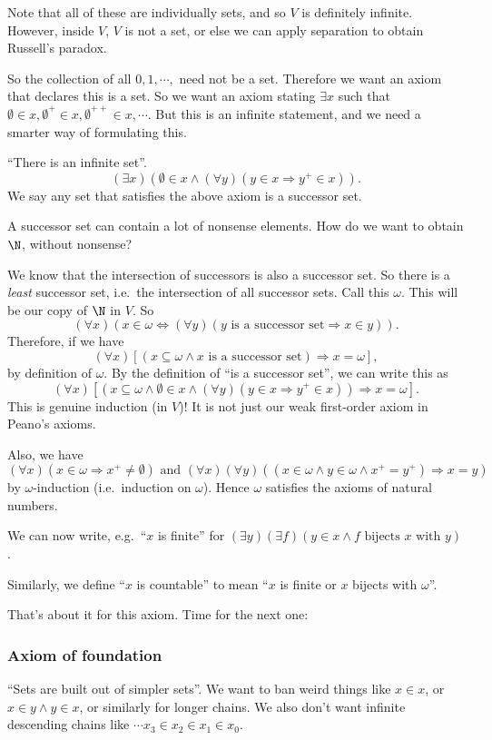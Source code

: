 \documentclass[a4paper]{article}
\begin{document}
Note that all of these are individually sets, and so $V$ is definitely infinite. However, inside $V$, $V$ is not a set, or else we can apply separation to obtain Russell's paradox.

So the collection of all $0, 1, \cdots, $ need not be a set. Therefore we want an axiom that declares this is a set. So we want an axiom stating $\exists x$ such that $\emptyset\in x, \emptyset^+\in x, \emptyset^{++}\in x, \cdots$. But this is an infinite statement, and we need a smarter way of formulating this.

\begin{axiom}
  ``There is an infinite set''.
  \[
    (\exists x)(\emptyset\in x \wedge (\forall y)(y\in x \Rightarrow y^+ \in x)).
  \]
  We say any set that satisfies the above axiom is a successor set.
\end{axiom}
A successor set can contain a lot of nonsense elements. How do we want to obtain $\N$, without nonsense?

We know that the intersection of successors is also a successor set. So there is a \emph{least} successor set, i.e.\ the intersection of all successor sets. Call this $\omega$. This will be our copy of $\N$ in $V$. So
\[
  (\forall x)(x\in \omega \Leftrightarrow (\forall y)(y\text{ is a successor set} \Rightarrow x \in y)).
\]
Therefore, if we have
\[
  (\forall x)[(x \subseteq \omega\wedge x\text{ is a successor set}) \Rightarrow x = \omega],
\]
by definition of $\omega$. By the definition of ``is a successor set'', we can write this as
\[
  (\forall x)[(x\subseteq \omega \wedge \emptyset\in x \wedge (\forall y)(y\in x \Rightarrow y^+ \in x))\Rightarrow x = \omega].
\]
This is genuine induction (in $V$)! It is not just our weak first-order axiom in Peano's axioms.

Also, we have
\[
  (\forall x)(x\in \omega \Rightarrow x^+ \not = \emptyset)\text{ and }(\forall x)(\forall y)((x\in \omega \wedge y\in \omega \wedge x^+ = y^+) \Rightarrow x = y)
\]
by $\omega$-induction (i.e.\ induction on $\omega$). Hence $\omega$ satisfies the axioms of natural numbers.

We can now write, e.g.\ ``$x$ is finite'' for $(\exists y)(\exists f)(y\in x \wedge f\text{ bijects }x\text{ with }y)$.

Similarly, we define ``$x$ is countable'' to mean ``$x$ is finite or $x$ bijects with $\omega$''.

That's about it for this axiom. Time for the next one:
\subsubsection*{Axiom of foundation}
``Sets are built out of simpler sets''. We want to ban weird things like $x\in x$, or $x\in y\wedge y\in x$, or similarly for longer chains. We also don't want infinite descending chains like $\cdots x_3 \in x_2 \in x_1 \in x_0$.
\end{document}
